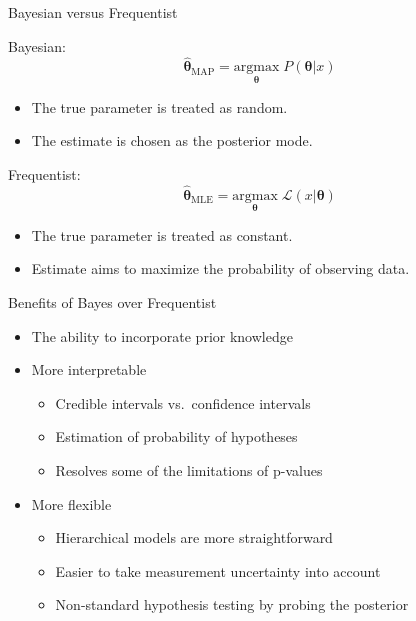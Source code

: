 \documentclass[
  ignorenonframetext,
]{beamer}
\providecommand{\tightlist}{%
  \setlength{\itemsep}{0pt}\setlength{\parskip}{0pt}}
\begin{document}
\begin{frame}{Bayesian versus Frequentist}
\protect\hypertarget{bayesian-versus-frequentist}{}
\begin{block}{Bayesian:}
$$\hat{\boldsymbol{\theta}}_{\text{MAP}}=\underset{\boldsymbol{\theta}}{\text{argmax}}  \;P(\boldsymbol{\theta}|x)$$


\begin{itemize}
    \item The true parameter is treated as random.
    \item The estimate is chosen as the posterior mode.
\end{itemize}
\end{block}

\begin{block}{Frequentist:}
$$\hat{\boldsymbol{\theta}}_{\text{MLE}}=\underset{\boldsymbol{\theta}}{\text{argmax}} \;\mathcal{L}(x|\boldsymbol{\theta})$$
\begin{itemize}
    \item The true parameter is treated as constant.
    \item Estimate aims to maximize the probability of observing data.
\end{itemize}
\end{block}
\end{frame}

\begin{frame}{Benefits of Bayes over Frequentist}
\protect\hypertarget{benefits-of-bayes-over-frequentist}{}
\begin{itemize}
\tightlist
\item
  The ability to incorporate prior knowledge
\item
  More interpretable

  \begin{itemize}
  \tightlist
  \item
    Credible intervals vs.~confidence intervals
  \item
    Estimation of probability of hypotheses
  \item
    Resolves some of the limitations of p-values
  \end{itemize}
\item
  More flexible

  \begin{itemize}
  \tightlist
  \item
    Hierarchical models are more straightforward
  \item
    Easier to take measurement uncertainty into account
  \item
    Non-standard hypothesis testing by probing the posterior
  \end{itemize}
\end{itemize}
\end{frame}
\end{document}
